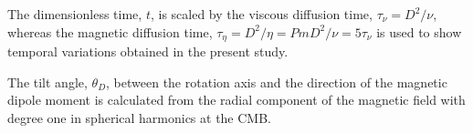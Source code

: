 The dimensionless time, $t$, is scaled by the viscous diffusion time, $\tau_\nu = D^2 / \nu$, whereas the magnetic diffusion time, $\tau_\eta = D^2 / \eta = Pm D^2 / \nu = 5 \tau_\nu$ is used to show temporal variations obtained 
in the present study.

The tilt angle, $\theta_D$, between the rotation axis and the direction of the magnetic dipole moment is calculated from the radial component of the magnetic field with degree one in spherical harmonics at the CMB.
